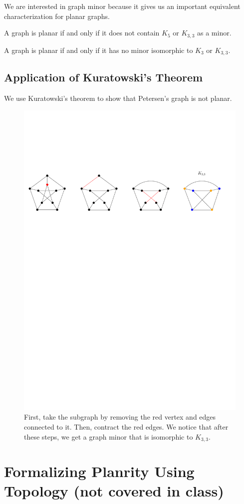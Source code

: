 We are interested in graph minor because it gives us an important equivalent characterization for planar graphs.

\begin{theorem}[Kuratowski, 1930]
    A graph is planar if and only if it does not contain $K_5$ or $K_{3,3}$ as a minor.
\end{theorem}

\begin{theorem}[Wagner, 1937]
    A graph is planar if and only if it has no minor isomorphic to $K_3$ or $K_{3,3}$.
\end{theorem}

\subsection{Application of Kuratowski's Theorem}

We use Kuratowski's theorem to show that Petersen's graph is not planar.

\begin{figure}[htbp]
    \centering
    \includegraphics[width=0.9\linewidth]{figures/petersen-graph-nonplanar.pdf}
    \caption{First, take the subgraph by removing the red vertex and edges connected to it. Then, contract the red edges. We notice that after these steps, we get a graph minor that is isomorphic to $K_{3,3}$.}
    \label{fig:petersen-graph-nonplanar}
\end{figure}

\section{Formalizing Planrity Using Topology (not covered in class)}